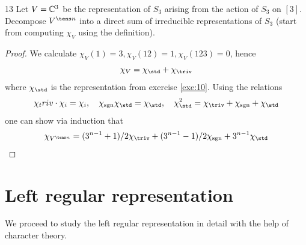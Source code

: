 \documentclass[twoside = false,	%
		headsepline,		%
		parskip = true,
		]{scrbook}						%
\begin{document}
    \begin{exercise}{}{13}
        Let $V = \mathbb C^3$ be the representation of $S_3$ arising from the action of $S_3$ on $[3]$. Decompose $V^{\tens n}$ into a direct sum of irreducible representations of $S_3$ (start from computing $\chi_V$ using the definition).
    \end{exercise}
    \begin{proof}
        We calculate $\chi_V(1) = 3, \chi_V(12) = 1, \chi_V(123) = 0$, hence
        \begin{equation*}
            \chi_V = \chi_{\std} + \chi_{\triv}
        \end{equation*}
        where $\chi_{\std}$ is the representation from exercise \ref{exe:10}. Using the relations
        \begin{equation*}
            \begin{split}
                \chi_triv \cdot \chi_i = \chi_i, \quad \chi_\sgn \chi_\std = \chi_\std, \quad \chi_\std^2 = \chi_\triv + \chi_\sgn + \chi_\std
            \end{split}
        \end{equation*}
        one can show via induction that
        \begin{equation*}
            \chi_{V^{\tens n}} = (3^{n-1}+1)/2 \chi_\triv + (3^{n-1}-1)/2 \chi_\sgn + 3^{n-1} \chi_\std
        \end{equation*}
    \end{proof}
\section{Left regular representation}
    We proceed to study the left regular representation in detail with the help of character theory.
\end{document}
